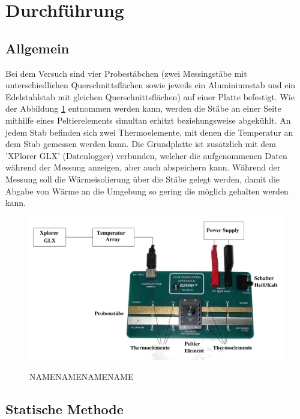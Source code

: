 \section{Durchführung}
\label{sec:Durchführung}

\subsection{Allgemein}

Bei dem Versuch sind vier Probestäbchen (zwei Messingstäbe mit unterschiedlichen 
Querschnittsflächen sowie jeweils ein Aluminiumstab und ein Edelstahlstab mit gleichen 
Querschnittsflächen) auf einer Platte befestigt. Wie der Abbildung \ref{fig:durchfuehrungbild1}
entnommen werden kann, werden die Stäbe an einer Seite mithilfe eines Peltierelements 
simultan erhitzt beziehungsweise abgekühlt. An jedem Stab befinden sich zwei Thermoelemente,
mit denen die Temperatur an dem Stab gemessen werden kann. Die Grundplatte ist zusätzlich mit 
dem 'XPlorer GLX' (Datenlogger) verbunden, welcher die aufgenommenen
Daten während der Messung anzeigen, aber auch abspeichern kann. Während der Messung soll die 
Wärmeisolierung über die Stäbe gelegt werden, damit die Abgabe von Wärme an die Umgebung so 
gering die möglich gehalten werden kann. 


\begin{figure}[H]
    \centering
    \includegraphics[width=13cm]{content/durchfuehrung1.png}
    \label{fig:durchfuehrungbild1}
    \caption{NAMENAMENAMENAME}
\end{figure}


\subsection{Statische Methode}

